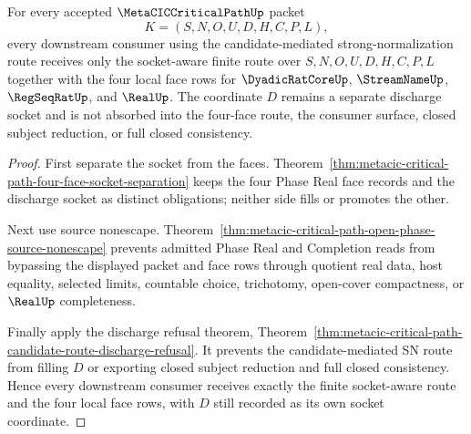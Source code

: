 \begin{theorem}
\label{thm:metacic-critical-path-candidate-sn-socket-nonescape}
For every accepted $\MetaCICCriticalPathUp$ packet
$$
K=(S,N,O,U,D,H,C,P,L),
$$
every downstream consumer using the candidate-mediated strong-normalization route receives only the socket-aware finite route over $S,N,O,U,D,H,C,P,L$ together with the four local face rows for $\DyadicRatCoreUp$, $\StreamNameUp$, $\RegSeqRatUp$, and $\RealUp$. The coordinate $D$ remains a separate discharge socket and is not absorbed into the four-face route, the consumer surface, closed subject reduction, or full closed consistency.
\end{theorem}
\begin{proof}
First separate the socket from the faces. Theorem~\ref{thm:metacic-critical-path-four-face-socket-separation} keeps the four Phase Real face records and the discharge socket as distinct obligations; neither side fills or promotes the other.

Next use source nonescape. Theorem~\ref{thm:metacic-critical-path-open-phase-source-nonescape} prevents admitted Phase Real and Completion reads from bypassing the displayed packet and face rows through quotient real data, host equality, selected limits, countable choice, trichotomy, open-cover compactness, or $\RealUp$ completeness.

Finally apply the discharge refusal theorem, Theorem~\ref{thm:metacic-critical-path-candidate-route-discharge-refusal}. It prevents the candidate-mediated SN route from filling $D$ or exporting closed subject reduction and full closed consistency. Hence every downstream consumer receives exactly the finite socket-aware route and the four local face rows, with $D$ still recorded as its own socket coordinate.
\end{proof}

